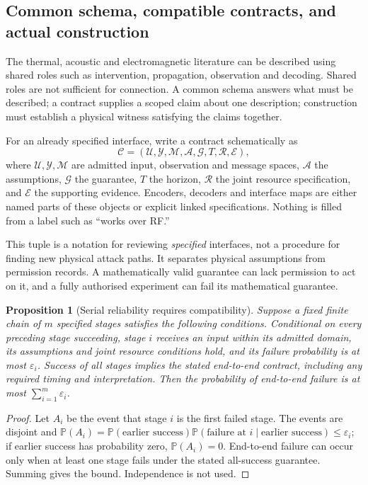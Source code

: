 \documentclass[11pt,a4paper]{article}
\newtheorem{proposition}[theorem]{Proposition}
\theoremstyle{definition}
\theoremstyle{remark}
\newcommand{\Prob}{\mathbb{P}}
\begin{document}
\subsection{Common schema, compatible contracts, and actual construction}
The thermal, acoustic and electromagnetic literature can be described using shared roles such as intervention, propagation, observation and decoding. Shared roles are not sufficient for connection. A common schema answers what must be described; a contract supplies a scoped claim about one description; construction must establish a physical witness satisfying the claims together.

For an already specified interface, write a contract schematically as
\[
 \mathcal C=(\mathcal U,\mathcal Y,\mathcal M,\mathcal A,\mathcal G,
 T,\mathcal R,\mathcal E),
\]
where $\mathcal U,\mathcal Y,\mathcal M$ are admitted input, observation and message spaces, $\mathcal A$ the assumptions, $\mathcal G$ the guarantee, $T$ the horizon, $\mathcal R$ the joint resource specification, and $\mathcal E$ the supporting evidence. Encoders, decoders and interface maps are either named parts of these objects or explicit linked specifications. Nothing is filled from a label such as ``works over RF.''

This tuple is a notation for reviewing \emph{specified} interfaces, not a procedure for finding new physical attack paths. It separates physical assumptions from permission records. A mathematically valid guarantee can lack permission to act on it, and a fully authorised experiment can fail its mathematical guarantee.

\begin{proposition}[Serial reliability requires compatibility]\label{prop:serial}
Suppose a fixed finite chain of $m$ specified stages satisfies the following conditions. Conditional on every preceding stage succeeding, stage $i$ receives an input within its admitted domain, its assumptions and joint resource conditions hold, and its failure probability is at most $\varepsilon_i$. Success of all stages implies the stated end-to-end contract, including any required timing and interpretation. Then the probability of end-to-end failure is at most $\sum_{i=1}^m\varepsilon_i$.
\end{proposition}
\begin{proof}
Let $A_i$ be the event that stage $i$ is the first failed stage. The events are disjoint and
$\Prob(A_i)=\Prob(\text{earlier success})\Prob(\text{failure at }i\mid\text{earlier success})\leq\varepsilon_i$; if earlier success has probability zero, $\Prob(A_i)=0$. End-to-end failure can occur only when at least one stage fails under the stated all-success guarantee. Summing gives the bound. Independence is not used.
\end{proof}
\end{document}
